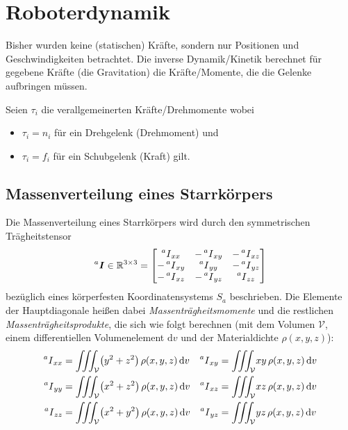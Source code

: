 \chapter{Roboterdynamik}
	Bisher wurden keine (statischen) Kräfte, sondern nur Positionen und Geschwindigkeiten betrachtet. Die inverse Dynamik/Kinetik \INVDYN berechnet für gegebene Kräfte (\zB die Gravitation) die Kräfte/Momente, die die Gelenke aufbringen müssen.

	Seien \( \tau_i \) die verallgemeinerten Kräfte/Drehmomente wobei
	\begin{itemize}
		\item \( \tau_i = n_i \) für ein Drehgelenk (Drehmoment) und
		\item \( \tau_i = f_i \) für ein Schubgelenk (Kraft) gilt.
	\end{itemize}

	\section{Massenverteilung eines Starrkörpers}
		Die Massenverteilung eines Starrkörpers wird durch den symmetrischen Trägheitstensor
		\begin{equation*}
			\prescript{a}{}{\bm{I}} \in \mathbb{R}^{3 \times 3} =
				\begin{bmatrix}
					\prescript{a}{}{I}_{xx}  & -\prescript{a}{}{I}_{xy} & -\prescript{a}{}{I}_{xz} \\
					-\prescript{a}{}{I}_{xy} & \prescript{a}{}{I}_{yy}  & -\prescript{a}{}{I}_{yz} \\
					-\prescript{a}{}{I}_{xz} & -\prescript{a}{}{I}_{yz} & \prescript{a}{}{I}_{zz}
				\end{bmatrix}
		\end{equation*}
		bezüglich eines körperfesten Koordinatensystems \(S_a\) beschrieben. Die Elemente der Hauptdiagonale heißen dabei \emph{Massenträgheitsmomente} und die restlichen \emph{Massenträgheitsprodukte}, die sich wie folgt berechnen (mit dem Volumen \(\mathcal{V}\), einem differentiellen Volumenelement \( \text{d}v \) und der Materialdichte \( \rho(x, y, z) \)):
		\begin{align*}
			\prescript{a}{}{I}_{xx} &= \iiint_{\mathcal{V}} \! \big(y^2 + z^2\big) \,\rho(x, y, z) \dd{v} & \prescript{a}{}{I}_{xy} &= \iiint_{\mathcal{V}} \! xy \,\rho(x, y, z) \dd{v} \\
			\prescript{a}{}{I}_{yy} &= \iiint_{\mathcal{V}} \! \big(x^2 + z^2\big) \,\rho(x, y, z) \dd{v} & \prescript{a}{}{I}_{xz} &= \iiint_{\mathcal{V}} \! xz \,\rho(x, y, z) \dd{v} \\
			\prescript{a}{}{I}_{zz} &= \iiint_{\mathcal{V}} \! \big(x^2 + y^2\big) \,\rho(x, y, z) \dd{v} & \prescript{a}{}{I}_{yz} &= \iiint_{\mathcal{V}} \! yz \,\rho(x, y, z) \dd{v}
		\end{align*}

